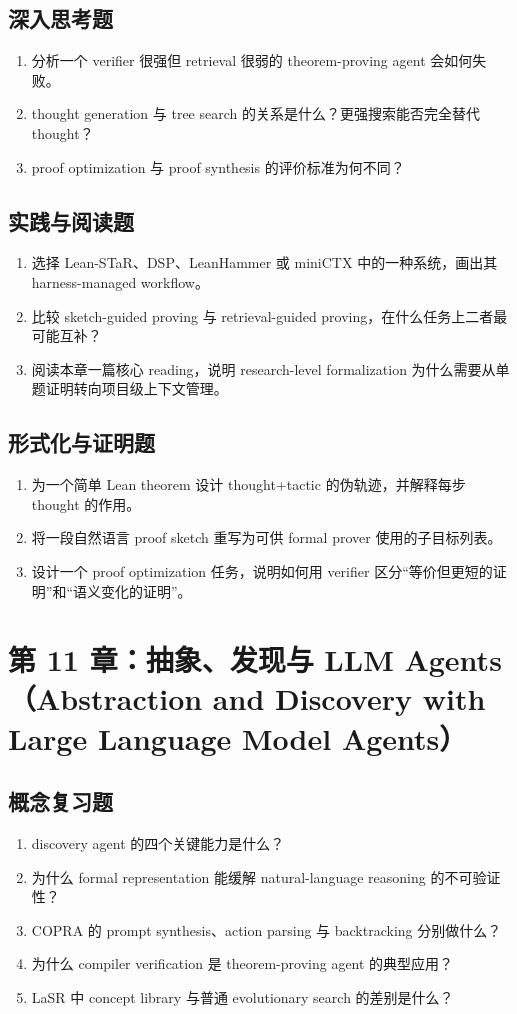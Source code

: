 \subsection*{深入思考题}
\begin{enumerate}
\item 分析一个 verifier 很强但 retrieval 很弱的 theorem-proving agent 会如何失败。
\item thought generation 与 tree search 的关系是什么？更强搜索能否完全替代 thought？
\item proof optimization 与 proof synthesis 的评价标准为何不同？
\end{enumerate}

\subsection*{实践与阅读题}
\begin{enumerate}
\item 选择 Lean-STaR、DSP、LeanHammer 或 miniCTX 中的一种系统，画出其 harness-managed workflow。
\item 比较 sketch-guided proving 与 retrieval-guided proving，在什么任务上二者最可能互补？
\item 阅读本章一篇核心 reading，说明 research-level formalization 为什么需要从单题证明转向项目级上下文管理。
\end{enumerate}

\subsection*{形式化与证明题}
\begin{enumerate}
\item 为一个简单 Lean theorem 设计 thought+tactic 的伪轨迹，并解释每步 thought 的作用。
\item 将一段自然语言 proof sketch 重写为可供 formal prover 使用的子目标列表。
\item 设计一个 proof optimization 任务，说明如何用 verifier 区分“等价但更短的证明”和“语义变化的证明”。
\end{enumerate}

\section{第 11 章：抽象、发现与 LLM Agents（Abstraction and Discovery with Large Language Model Agents）}

\subsection*{概念复习题}
\begin{enumerate}
\item discovery agent 的四个关键能力是什么？
\item 为什么 formal representation 能缓解 natural-language reasoning 的不可验证性？
\item COPRA 的 prompt synthesis、action parsing 与 backtracking 分别做什么？
\item 为什么 compiler verification 是 theorem-proving agent 的典型应用？
\item LaSR 中 concept library 与普通 evolutionary search 的差别是什么？
\end{enumerate}


